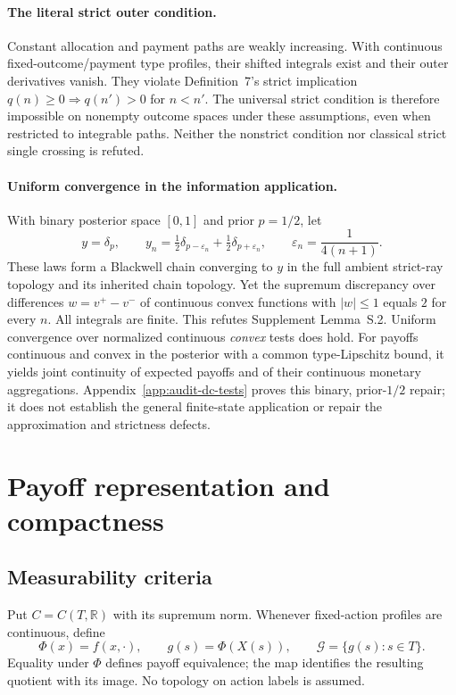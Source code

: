 \documentclass[11pt]{article}
\theoremstyle{remark}\newtheorem{remark}[theorem]{Remark}
\newcommand{\R}{\mathbb R}
\newcommand{\G}{\mathcal G}
\begin{document}
\paragraph{The literal strict outer condition.}
Constant allocation and payment paths are weakly increasing. With continuous fixed-outcome/payment type profiles, their shifted integrals exist and their outer derivatives vanish. They violate Definition~7's strict implication $q(n)\ge0\Rightarrow q(n')>0$ for $n<n'$. The universal strict condition is therefore impossible on nonempty outcome spaces under these assumptions, even when restricted to integrable paths. Neither the nonstrict condition nor classical strict single crossing is refuted.

\paragraph{Uniform convergence in the information application.}
With binary posterior space $[0,1]$ and prior $p=1/2$, let
\[
 y=\delta_p,\qquad y_n=\tfrac12\delta_{p-\varepsilon_n}
                 +\tfrac12\delta_{p+\varepsilon_n},
 \qquad \varepsilon_n=\frac1{4(n+1)}.
\]
These laws form a Blackwell chain converging to $y$ in the full ambient strict-ray topology and its inherited chain topology. Yet the supremum discrepancy over differences $w=v^+-v^-$ of continuous convex functions with $|w|\le1$ equals $2$ for every $n$. All integrals are finite. This refutes Supplement Lemma~S.2. Uniform convergence over normalized continuous \emph{convex} tests does hold. For payoffs continuous and convex in the posterior with a common type-Lipschitz bound, it yields joint continuity of expected payoffs and of their continuous monetary aggregations. Appendix~\ref{app:audit-dc-tests} proves this binary, prior-$1/2$ repair; it does not establish the general finite-state application or repair the approximation and strictness defects.

\appendix
\section{Payoff representation and compactness}\label{app:representation}\subsection{Measurability criteria}
Put $C=C(T,\R)$ with its supremum norm. Whenever fixed-action profiles are continuous, define
\[
 \Phi(x)=f(x,\cdot),\qquad g(s)=\Phi(X(s)),\qquad
 \G=\{g(s):s\in T\}.
\]
Equality under $\Phi$ defines payoff equivalence; the map identifies the resulting quotient with its image. No topology on action labels is assumed.
\end{document}
